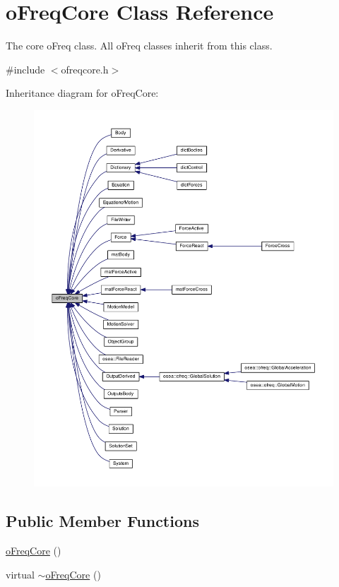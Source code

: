 \hypertarget{classo_freq_core}{\section{o\-Freq\-Core Class Reference}
\label{classo_freq_core}
}


The core o\-Freq class. All o\-Freq classes inherit from this class.  




{\ttfamily \#include $<$ofreqcore.\-h$>$}



Inheritance diagram for o\-Freq\-Core\-:
\nopagebreak
\begin{figure}[H]
\begin{center}
\leavevmode
\includegraphics[width=350pt]{classo_freq_core__inherit__graph}
\end{center}
\end{figure}
\subsection*{Public Member Functions}
\begin{DoxyCompactItemize}
\item 
\hyperlink{classo_freq_core_a5c882c0d8e78706270e377b749a647f5}{o\-Freq\-Core} ()
\item 
virtual \hyperlink{classo_freq_core_aea5887547dbd17fc2d4f1a99fe217918}{$\sim$o\-Freq\-Core} ()
\end{DoxyCompactItemize}
